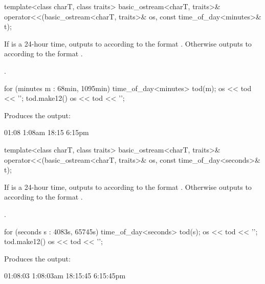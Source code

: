 %
\begin{itemdecl}
template<class charT, class traits>
  basic_ostream<charT, traits>&
    operator<<(basic_ostream<charT, traits>& os, const time_of_day<minutes>& t);
\end{itemdecl}

\begin{itemdescr}
\pnum
\effects
If  is a 24-hour time,
outputs to  according to the format
.
Otherwise
outputs to  according to the format
.

\pnum
\returns {}.

\begin{example}
\begin{codeblock}
for (minutes m : {68min, 1095min}) {
  time_of_day<minutes> tod(m);
  os << tod << '\n';
  tod.make12()
  os << tod << '\n';
}
\end{codeblock}

Produces the output:

\begin{codeblock}
01:08
1:08am
18:15
6:15pm
\end{codeblock}
\end{example}
\end{itemdescr}

%
\begin{itemdecl}
template<class charT, class traits>
  basic_ostream<charT, traits>&
    operator<<(basic_ostream<charT, traits>& os, const time_of_day<seconds>& t);
\end{itemdecl}

\begin{itemdescr}
\pnum
\effects
If  is a 24-hour time,
outputs to  according to the format
.
Otherwise
outputs to  according to the format
.

\pnum
\returns {}.

\begin{example}
\begin{codeblock}
for (seconds s : {4083s, 65745s}) {
  time_of_day<seconds> tod(s);
  os << tod << '\n';
  tod.make12()
  os << tod << '\n';
}
\end{codeblock}

Produces the output:

\begin{codeblock}
01:08:03
1:08:03am
18:15:45
6:15:45pm
\end{codeblock}
\end{example}
\end{itemdescr}

